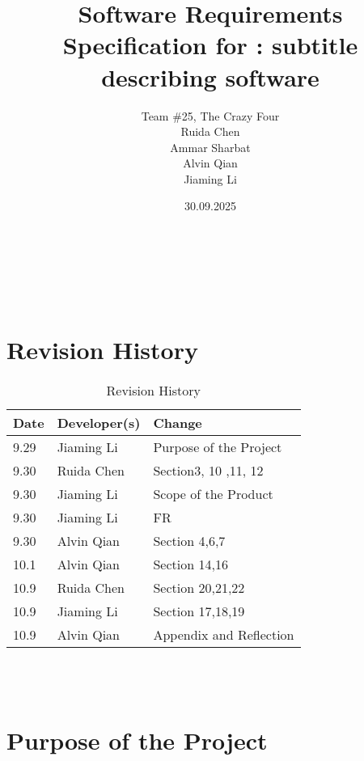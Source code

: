 \documentclass[12pt]{article}
\begin{document}
\title{Software Requirements Specification for \progname: subtitle describing software}
\author{
    Team \#25, The Crazy Four \\[1ex]
    Ruida Chen \\
    Ammar Sharbat \\
    Alvin Qian \\
    Jiaming Li
}
\date{30.09.2025}
    
\maketitle

~\newpage


\tableofcontents

~\newpage

\section*{Revision History}

\begin{table}[hp]
    \caption{Revision History} \label{TblRevisionHistory}
    \begin{tabularx}{\textwidth}{llX}
        \toprule
        \textbf{Date} & \textbf{Developer(s)} & \textbf{Change}\\
        \midrule
        9.29 & Jiaming Li & Purpose of the Project\\
        9.30 & Ruida Chen & Section3, 10 ,11,  12\\
        9.30 & Jiaming Li & Scope of the Product\\
        9.30 & Jiaming Li & FR\\
        9.30 & Alvin Qian & Section 4,6,7\\
        10.1 & Alvin Qian & Section 14,16\\
        10.9 & Ruida Chen & Section 20,21,22\\
        10.9 & Jiaming Li & Section 17,18,19\\
        10.9 & Alvin Qian & Appendix and Reflection\\
        \bottomrule
    \end{tabularx}
\end{table}

~\\

~\newpage
\section{Purpose of the Project}
\end{document}
